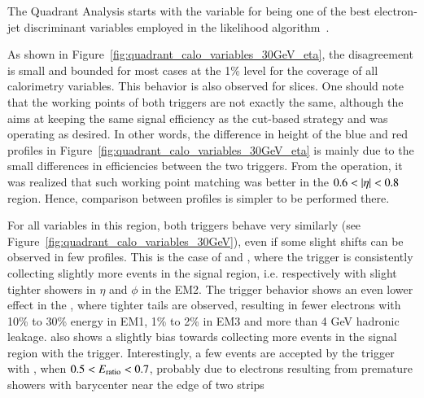 The Quadrant Analysis starts with the variable \reta{} for being one of the best electron-jet discriminant variables employed in the likelihood
algorithm~\cite{aaboud2019electron}. 



As shown in Figure~\ref{fig:quadrant_calo_variables_30GeV_eta}, the disagreement is small and bounded for most cases at the 1\% level for the coverage of all calorimetry variables. 
This behavior is also observed for \et{} slices. 
One should note that the working points of both triggers are not exactly the same, although the \rnn{} aims at keeping the same signal efficiency as the cut-based strategy and was operating as desired.  
In other words, 
the difference in height of the blue and red profiles in Figure~\ref{fig:quadrant_calo_variables_30GeV_eta} is mainly due to the small differences in efficiencies between the two triggers.
From the operation, it was realized that such working point matching was better in the $0.6<\abseta{}<0.8$ region. Hence, comparison between profiles is simpler to be performed there.

For all variables in this region, both triggers behave very similarly (see Figure~\ref{fig:quadrant_calo_variables_30GeV}), even if some slight shifts can be observed in few profiles. This is the case of \reta{} and \rphi{}, where the \rnn{} trigger is consistently collecting slightly more events in the signal region, i.e. respectively with slight tighter showers in $\eta{}$ and $\phi{}$ in the EM2. The \rnn{} trigger behavior shows an even lower effect in the \rhad{}, where tighter tails are observed, resulting in fewer electrons with 10\% to 30\% energy in EM1, 1\% to 2\% in EM3 and more than 4 GeV hadronic leakage. \eratio{} also shows a slightly bias towards collecting more events in the signal region with the \rnn{} trigger. Interestingly, a few events are accepted by the trigger with \rnn{}, when $0.5<E_\text{ratio}{}<0.7$, probably due to electrons resulting from premature showers with barycenter near the edge of two strips

